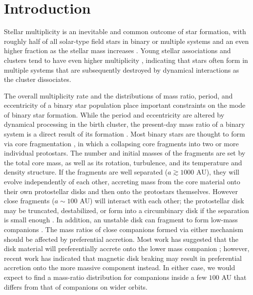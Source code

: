 \documentclass{emulateapj}
\begin{document}
\section{Introduction}


\label{sec:intro}

Stellar multiplicity is an inevitable and common outcome of star formation, with roughly half of all solar-type field stars in binary or multiple systems \citep{Raghavan2010} and an even higher fraction as the stellar mass increases \citep{Zinnecker2007}. Young stellar associations and clusters tend to have even higher multiplicity \citep{Duchene2013}, indicating that stars often form in multiple systems that are subsequently destroyed by dynamical interactions as the cluster dissociates. 

The overall multiplicity rate and the distributions of mass ratio, period, and eccentricity of a binary star population place important constraints on the mode of binary star formation. While the period and eccentricity are altered by dynamical processing in the birth cluster, the present-day mass ratio of a binary system is a direct result of its formation \citep{Parker2013}. Most binary stars are thought to form via core fragmentation \citep{Boss1979, Boss1986, Bate1995}, in which a collapsing core fragments into two or more individual protostars. The number and initial masses of the fragments are set by the total core mass, as well as its rotation, turbulence, and its temperature and density structure. If the fragments are well separated ($a \gtrsim 1000$ AU), they will evolve independently of each other, accreting mass from the core material onto their own protostellar disks and then onto the protostars themselves. However close fragments ($a \sim 100$ AU) will interact with each other; the protostellar disk may be truncated, destabilized, or form into a circumbinary disk if the separation is small enough \citep{Bate1997}. In addition, an unstable disk can fragment to form low-mass companions \citep{Kratter2006, Stamatellos2011}. The mass ratios of close companions formed via either mechanism should be affected by preferential accretion. Most work has suggested that the disk material will preferentially accrete onto the lower mass companion \citep{Bate1997, BBB2002}; however, recent work has indicated that magnetic disk braking may result in preferential accretion onto the more massive component \citep{Zhao2013} instead. In either case, we would expect to find a mass-ratio distribution for companions inside a few $100$ AU that differs from that of companions on wider orbits.
\end{document}
